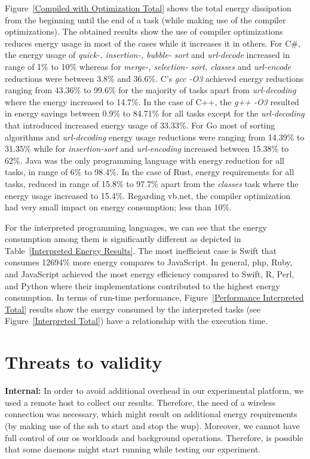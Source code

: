 Figure~\ref{Compiled with Optimization Total} shows the total 
energy dissipation from the beginning until the end of a task 
(while making use of the compiler optimizations).
The obtained results show the use of compiler optimizations 
reduces energy usage in most of the cases while it increases 
it in others. 
For C\#, the energy usage of \textit{quick-, 
	insertion-, bubble- sort} and \textit{url-decode} increased in range of 
1\% to 10\% whereas for \textit{merge-, selection- sort, classes} and 
\textit{url-encode} reductions were between 3.8\% and 36.6\%. 
C's \textit{gcc -O3} achieved energy reductions ranging from 43.36\% 
to 99.6\% for the majority of tasks apart from \textit{url-decoding} 
where the energy increased to 14.7\%.
In the case of C++, the \textit{g++ -O3} resulted in energy savings 
between 0.9\% to 84.71\% for all tasks except for the \textit{url-decoding} 
that introduced increased energy usage of 33.33\%.
For Go most of sorting algorithms and \textit{url-decoding} energy 
usage reductions were ranging from 14.39\% to 31.35\% while for \textit{insertion-sort} 
and \textit{url-encoding} increased between 15.38\% to 62\%. 
Java was the only programming language with energy reduction for 
all tasks, in range of 6\% to 98.4\%.
In the case of Rust, energy requirements for all tasks, reduced in 
range of 15.8\% to 97.7\% apart from the \textit{classes} task 
where the energy usage increased to 15.4\%. 
Regarding {\sc vb.net}, the compiler optimization had very small 
impact on energy consumption; less than 10\%.


For the interpreted programming languages, we can see that the 
energy consumption among them is significantly different as 
depicted in Table~\ref{Interpreted Energy Results}. 
The most inefficient case is Swift that consumes 12694\% more energy 
compares to JavaScript. 
In general, {\sc php}, Ruby, and JavaScript achieved the most energy efficiency 
compared to Swift, R, Perl, and Python where their implementations 
contributed to the highest energy consumption. 
In terms of run-time performance, Figure~\ref{Performance Interpreted Total} 
results show the energy consumed by the interpreted tasks (see Figure~\ref{Interpreted Total}) 
have a relationship with the execution time.


\section{Threats to validity} \label{threats_of_validity}
\noindent\textbf{Internal:} In order to avoid additional overhead 
in our experimental platform, we used a remote host to collect our 
results. 
Therefore, the need of a wireless connection was necessary, which 
might result on additional energy requirements (by making use of 
the {\sc ssh} to start and stop the {\sc wup}). 
Moreover, we cannot have full control of our {\sc os} workloads 
and background operations. 
Therefore, is possible that some daemons might start running 
while testing our experiment. 

